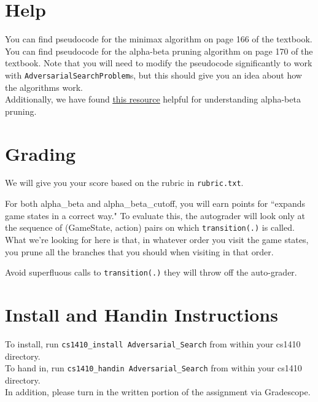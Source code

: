 \documentclass{article}
\begin{document}
\section{Help}
You can find pseudocode for the minimax algorithm on page 166 of the textbook. 
You can find pseudocode for the alpha-beta pruning algorithm on page 170 of the textbook.
Note that you will need to modify the pseudocode significantly to work with \verb|AdversarialSearchProblem|s, but this should give you an idea about how the algorithms work. ~\\

Additionally, we have found \href{http://inst.eecs.berkeley.edu/~cs61b/fa14/ta-materials/apps/ab_tree_practice/}{\underline{this resource}} helpful for understanding alpha-beta pruning.

\section{Grading}

We will give you your score based on the rubric in \verb|rubric.txt|.

For both alpha\_beta and alpha\_beta\_cutoff, you will earn points for ``expands game states in a correct way."
To evaluate this, the autograder will look only at the sequence of (GameState, action) pairs on which \verb|transition(.)| is called.
What we're looking for here is that, in whatever order you visit the game states, you prune all the branches that you should when visiting in that order.

Avoid superfluous calls to \verb|transition(.)| they will throw off the auto-grader. 

\section{Install and Handin Instructions}
To install, run \verb|cs1410_install Adversarial_Search| from within your cs1410 directory. ~\\

To hand in, run \verb|cs1410_handin Adversarial_Search| from within your cs1410 directory. ~\\

In addition, please turn in the written portion of the assignment via Gradescope.
\end{document}
